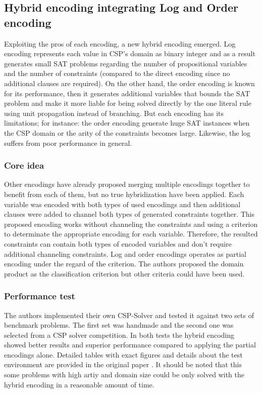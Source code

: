 \subsection{Hybrid encoding integrating Log and Order encoding}
Exploiting the pros of each encoding, a new hybrid encoding emerged. Log encoding represents each value in CSP's domain as binary integer and as a result generates small SAT problems regarding the number of propositional variables and the number of constraints (compared to the direct encoding since no additional clauses are required). On the other hand, the order encoding is known for its performance, then it generates additional variables that bounds the SAT problem and make it more liable for being solved directly by the one literal rule using unit propagation instead of branching. But each encoding has its limitations; for instance: the order encoding generate huge SAT instances when the CSP domain or the arity of the constraints becomes large. Likewise, the log suffers from poor performance in general.

\subsubsection{Core idea}
Other encodings have already proposed merging multiple encodings together to benefit from each of them, but no true hybridization have been applied. Each variable was encoded with both types of used encodings and then additional clauses were added to channel both types of generated constraints together. This proposed encoding works without channeling the constraints and using a criterion to determinate the appropriate encoding for each variable. Therefore, the resulted constraints can contain both types of encoded variables and don't require additional channeling constraints. Log and order encodings operates as partial encoding under the regard of the criterion. The authors proposed the domain product as the classification criterion but other criteria could have been used. \cite{soh2015hybrid}

\subsubsection{Performance test}
The authors implemented their own CSP-Solver and tested it against two sets of benchmark problems. The first set was handmade and the second one was selected from a CSP solver competition. In both tests the hybrid encoding showed better results and superior performance compared to applying the partial encodings alone. Detailed tables with exact figures and details about the test environment are provided in the original paper \cite{soh2015hybrid}. It should be noted that this some problems with high artiy and domain size could be only solved with the hybrid encoding in a reasonable amount of time.